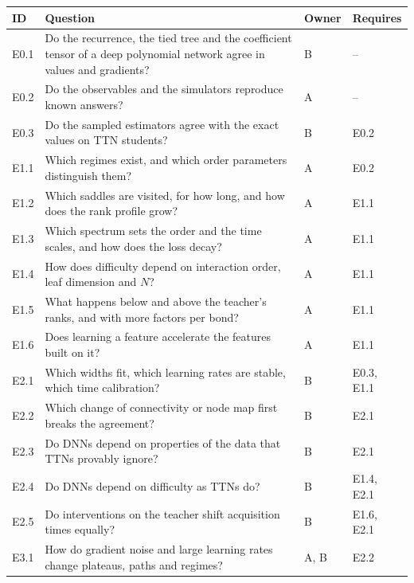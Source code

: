 \documentclass[11pt]{article}
\theoremstyle{definition}
\numberwithin{equation}{section}
\begin{document}
\begin{table}[tbp]
\centering
\footnotesize
\renewcommand{\arraystretch}{1.2}
\begin{tabular}{p{}p{}p{}p{}}
\hline
\raggedright ID & \raggedright Question & \raggedright Owner & \raggedright Requires \tabularnewline
\hline
\raggedright E0.1 & \raggedright Do the recurrence, the tied tree and the coefficient tensor of a deep polynomial network agree in values and gradients? & \raggedright B & \raggedright -- \tabularnewline
\raggedright E0.2 & \raggedright Do the observables and the simulators reproduce known answers? & \raggedright A & \raggedright -- \tabularnewline
\raggedright E0.3 & \raggedright Do the sampled estimators agree with the exact values on TTN students? & \raggedright B & \raggedright E0.2 \tabularnewline
\raggedright E1.1 & \raggedright Which regimes exist, and which order parameters distinguish them? & \raggedright A & \raggedright E0.2 \tabularnewline
\raggedright E1.2 & \raggedright Which saddles are visited, for how long, and how does the rank profile grow? & \raggedright A & \raggedright E1.1 \tabularnewline
\raggedright E1.3 & \raggedright Which spectrum sets the order and the time scales, and how does the loss decay? & \raggedright A & \raggedright E1.1 \tabularnewline
\raggedright E1.4 & \raggedright How does difficulty depend on interaction order, leaf dimension and $N$? & \raggedright A & \raggedright E1.1 \tabularnewline
\raggedright E1.5 & \raggedright What happens below and above the teacher's ranks, and with more factors per bond? & \raggedright A & \raggedright E1.1 \tabularnewline
\raggedright E1.6 & \raggedright Does learning a feature accelerate the features built on it? & \raggedright A & \raggedright E1.1 \tabularnewline
\raggedright E2.1 & \raggedright Which widths fit, which learning rates are stable, which time calibration? & \raggedright B & \raggedright E0.3, E1.1 \tabularnewline
\raggedright E2.2 & \raggedright Which change of connectivity or node map first breaks the agreement? & \raggedright B & \raggedright E2.1 \tabularnewline
\raggedright E2.3 & \raggedright Do DNNs depend on properties of the data that TTNs provably ignore? & \raggedright B & \raggedright E2.1 \tabularnewline
\raggedright E2.4 & \raggedright Do DNNs depend on difficulty as TTNs do? & \raggedright B & \raggedright E1.4, E2.1 \tabularnewline
\raggedright E2.5 & \raggedright Do interventions on the teacher shift acquisition times equally? & \raggedright B & \raggedright E1.6, E2.1 \tabularnewline
\raggedright E3.1 & \raggedright How do gradient noise and large learning rates change plateaus, paths and regimes? & \raggedright A, B & \raggedright E2.2 \tabularnewline

\end{tabular}
\end{table}
\end{document}
